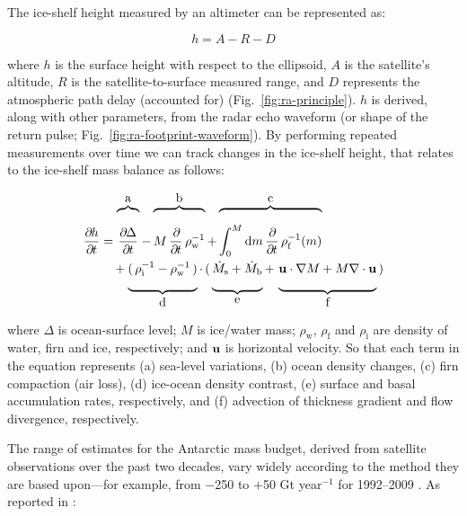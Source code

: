 \newpage

The ice-shelf height measured by an altimeter can be represented as:

\begin{equation}
  h = A - R - D
\end{equation}
\label{eq:ra-height}

\noindent
where $h$ is the surface height with respect to the ellipsoid, $A$ is the satellite's altitude, $R$ is the satellite-to-surface measured range, and $D$ represents the atmospheric path delay (accounted for) (Fig.~\ref{fig:ra-principle}). $h$ is derived, along with other parameters, from the radar echo waveform (or shape of the return pulse; Fig.~\ref{fig:ra-footprint-waveform}). By performing repeated measurements over time we can track changes in the ice-shelf height, that relates to the ice-shelf mass balance as follows:

\begin{equation}
\begin{split}
  \frac{\del h}{\del t} &= 
    \overbrace{
      \frac{\del \Delta}{\del t}
      \rule[20pt]{0pt}{5pt}}^{\mbox{a}}
    -\overbrace{
      M \, \frac{\del}{\del t} \, \rho^{-1}_\text{w}
      \rule[20pt]{0pt}{5pt}}^{\mbox{b}}
    +\overbrace{
      \int^M_0 \text{d}m \, \frac{\del}{\del t} \, \rho^{-1}_\text{f}(m)
      \rule[20pt]{0pt}{5pt}}^{\mbox{c}} \\
    &\quad +\underbrace{
      ( \, \rho^{-1}_\text{i} - \rho^{-1}_\text{w} \, ) 
      \rule[-11pt]{0pt}{5pt}}_{\mbox{d}}
    \cdot \, ( \, 
      \underbrace{ \dot{M}_\text{s} + \dot{M}_\text{b}
      \rule[-11pt]{0pt}{5pt}}_{\mbox{e}}
      + \, 
      \underbrace{ \vect{u} \cdot \nabla M + M \nabla \cdot \vect{u} 
      \rule[-11pt]{0pt}{5pt}}_{\mbox{f}}
    \, )
\end{split}
\end{equation}
\label{eq:ra-height-change}

\noindent
where $\Delta$ is ocean-surface level; $M$ is ice/water mass; $\rho_\text{w}$, $\rho_\text{f}$ and $\rho_\text{i}$ are density of water, firn and ice, respectively; and $\mathbf{u}$ is horizontal velocity. So that each term in the equation represents (a) sea-level variations, (b) ocean density changes, (c) firn compaction (air loss), (d) ice-ocean density contrast, (e) surface and basal accumulation rates, respectively, and (f) advection of thickness gradient and flow divergence, respectively.

The range of estimates for the Antarctic mass budget, derived from satellite observations over the past two decades, vary widely according to the method they are based upon---for example, from
$-$250 to $+$50 Gt year$^{-1}$ for 1992--2009 \parencite{Zwally2011}. As reported in
\textcite{Zwally2011}:


